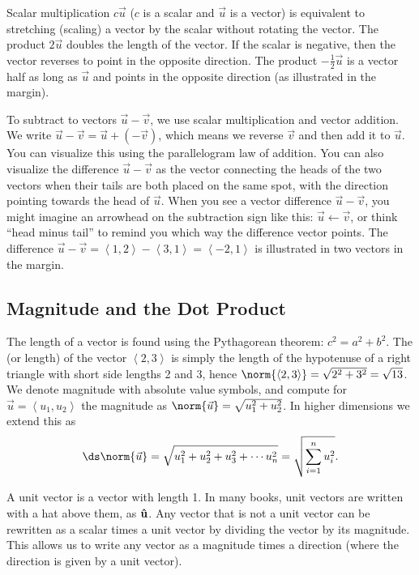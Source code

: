 Scalar multiplication $c\vec u$ ($c$ is a scalar and $\vec u$ is a vector) is equivalent to stretching (scaling) a vector by the scalar without rotating the vector. The product $2\vec u$ doubles the length of the vector. If the scalar is negative, then the vector reverses to point in the opposite direction.  The product $-\frac{1}{2}\vec u$ is a vector half as long as $\vec u$ and points in the opposite direction (as illustrated in the margin).

To subtract to vectors $\vec u-\vec v$, we use scalar multiplication and vector addition.  We write $\vec u-\vec v = \vec u +(-\vec v)$, which means we reverse $\vec v$ and then add it to $\vec u$.  You can visualize this using the parallelogram law of addition.  You can also visualize the difference $\vec u-\vec v$ as the vector connecting the heads of the two vectors when their tails are both placed on the same spot, with the direction pointing towards the head of $\vec u$.  When you see a vector difference $\vec u-\vec v$, you might imagine an arrowhead on the subtraction sign like this: $\vec u \leftarrow \vec v$, or think ``head  minus tail'' to remind you which way the difference vector points. The difference $\vec u - \vec v=\left<1,2\right> - \left<3,1\right> = \left<-2,1\right>$ is illustrated in two vectors in the margin.

\subsection{Magnitude and the Dot Product}
The length of a vector is found using the Pythagorean theorem: $c^2=a^2+b^2$.  The  (or length) of the vector $\left<2,3\right>$ is simply the length of the hypotenuse of a right triangle with short side lengths 2 and 3, hence $\norm{\left<2,3\right>}=\sqrt{2^2+3^2}=\sqrt{13}$. We denote magnitude with absolute value symbols, and compute for $\vec u = \left<u_1,u_2\right>$ the magnitude as $\norm{\vec u} = \sqrt{u_1^2+u_2^2}$.  In higher dimensions we extend this as $$\ds \norm{\vec u} = \sqrt{u_1^2+u_2^2+u_3^2+\cdots u_n^2} = \sqrt{\sum_{i=1}^n u_i^2}.$$ 

A unit vector is a vector with length 1. 
 In many books, unit vectors are written with a hat above them, as $\bf{\hat u}$.
Any vector that is not a unit vector can be rewritten as a scalar times a unit vector by dividing the vector by its magnitude. This allows us to write any vector as a magnitude times a direction (where the direction is given by a unit vector).
 
